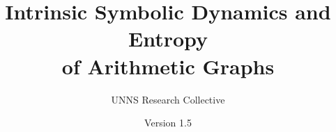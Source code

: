 
\title{Intrinsic Symbolic Dynamics and Entropy\\ of Arithmetic Graphs}
\author{UNNS Research Collective}
\date{Version 1.5}

\maketitle







